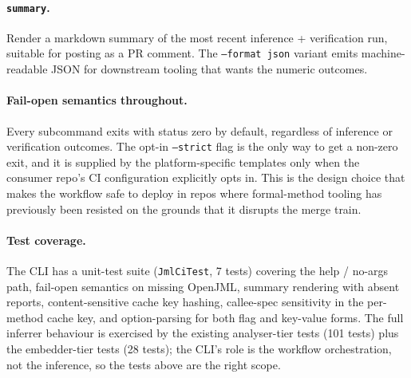 \paragraph{\texttt{summary}.}
Render a markdown summary of the most recent inference + verification run, suitable for posting as a PR comment. The {\tt --format json} variant emits machine-readable JSON for downstream tooling that wants the numeric outcomes.

\paragraph{Fail-open semantics throughout.}
Every subcommand exits with status zero by default, regardless of inference or verification outcomes. The opt-in {\tt --strict} flag is the only way to get a non-zero exit, and it is supplied by the platform-specific templates only when the consumer repo's CI configuration explicitly opts in. This is the design choice that makes the workflow safe to deploy in repos where formal-method tooling has previously been resisted on the grounds that it disrupts the merge train.

\paragraph{Test coverage.}
The CLI has a unit-test suite ({\tt JmlCiTest}, 7 tests) covering the help / no-args path, fail-open semantics on missing OpenJML, summary rendering with absent reports, content-sensitive cache key hashing, callee-spec sensitivity in the per-method cache key, and option-parsing for both flag and key-value forms. The full inferrer behaviour is exercised by the existing analyser-tier tests (101 tests) plus the embedder-tier tests (28 tests); the CLI's role is the workflow orchestration, not the inference, so the tests above are the right scope.
